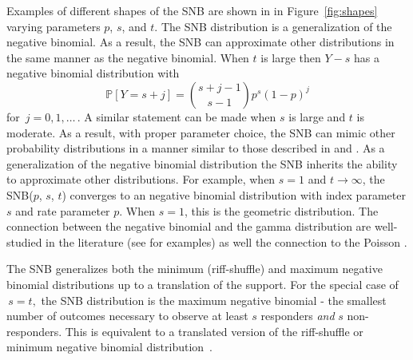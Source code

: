 \documentclass[sii]{ipart}
\begin{document}
Examples of different 
shapes of the SNB are shown in in Figure~\ref{fig:shapes} varying parameters $p$, 
$s$, and $t$. The SNB distribution is a generalization of the negative 
binomial. As a result, the SNB can approximate other distributions in the same
manner as the negative binomial. When $t$ is large then $Y-s$ has a 
negative binomial distribution with
\begin{equation*}                                    %
\mathbb{P}[Y=s+j ]        \label{nb1.eq}          
  = {{s+j-1}\choose{s-1}} p^s (1-p)^j
\end{equation*}
for $\,j=0, 1,\ldots\,$. A similar statement can be made when $s$ is large
and $t$ is moderate. As a result, with proper parameter choice, the SNB
can mimic other probability distributions in a manner similar to 
those described in \cite{Best1974} and \cite{Peizer1968}. As a generalization of the negative binomial distribution the 
SNB inherits the ability to approximate other distributions. For example,
when $s=1$ and $t \rightarrow \infty$, the SNB($p$, $s$, $t$) converges
to an negative binomial distribution with index parameter $s$ and rate parameter $p$. When $s=1$, this is the geometric distribution. The connection between the negative binomial and the gamma distribution
are well-studied in the literature (see \cite{Best1974,Ord1968,Guenther1972} for examples) as well the connection to the Poisson \cite{Anscombe1950}.

The SNB generalizes both the minimum (riff-shuffle) and maximum negative
binomial distributions up to a translation of the support.
For the special case of $\,s=t,$ the SNB distribution is the
maximum negative binomial \cite{Johnson2005,Zelterman2005,Zhang2000} - 
the smallest number of outcomes necessary to 
observe at least $s$ responders {\em and} $s$ non-responders. This is equivalent to a 
translated version of the riff-shuffle or minimum negative binomial 
distribution~\citep{Johnson2005,Uppuluri1967}.
\end{document}
